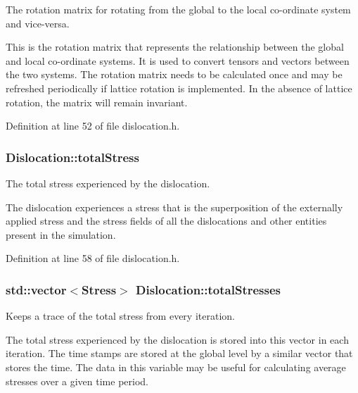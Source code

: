 \-The rotation matrix for rotating from the global to the local co-\/ordinate system and vice-\/versa. 

\-This is the rotation matrix that represents the relationship between the global and local co-\/ordinate systems. \-It is used to convert tensors and vectors between the two systems. \-The rotation matrix needs to be calculated once and may be refreshed periodically if lattice rotation is implemented. \-In the absence of lattice rotation, the matrix will remain invariant. 

\-Definition at line 52 of file dislocation.\-h.

\hypertarget{classDislocation_ae27176c0d47fec3e188d7caa4c52f366}{
\subsubsection[{total\-Stress}]{ {\bf \-Dislocation\-::total\-Stress}}}\label{d3/dc6/classDislocation_ae27176c0d47fec3e188d7caa4c52f366}


\-The total stress experienced by the dislocation. 

\-The dislocation experiences a stress that is the superposition of the externally applied stress and the stress fields of all the dislocations and other entities present in the simulation. 

\-Definition at line 58 of file dislocation.\-h.

\hypertarget{classDislocation_adb36ed6c1772f2614ffbed4dcc748c13}{
\subsubsection[{total\-Stresses}]{\setlength{\rightskip}{0pt plus 5cm}std\-::vector$<${\bf \-Stress}$>$ {\bf \-Dislocation\-::total\-Stresses}}}\label{d3/dc6/classDislocation_adb36ed6c1772f2614ffbed4dcc748c13}


\-Keeps a trace of the total stress from every iteration. 

\-The total stress experienced by the dislocation is stored into this vector in each iteration. \-The time stamps are stored at the global level by a similar vector that stores the time. \-The data in this variable may be useful for calculating average stresses over a given time period. 

